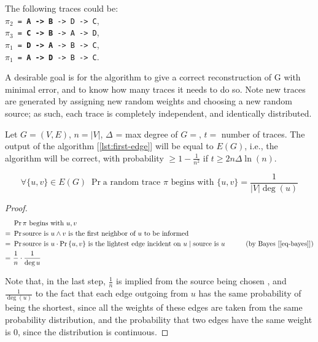 The following traces could be:\\
\texttt{$\pi_2$ = \textbf{A -> B} -> D -> C},\\
\texttt{$\pi_3$ = \textbf{C -> B} -> A -> D},\\
\texttt{$\pi_1$ = \textbf{D -> A} -> B -> C},\\
\texttt{$\pi_1$ = \textbf{A -> D} -> B -> C}.

A desirable goal is for the algorithm to give a correct reconstruction of G with minimal error, and to know how many traces it needs to do so. Note new traces are generated by assigning new random weights and choosing a new random source; as such, each trace is completely independent, and identically distributed.

\begin{thm}\label{thm:first-edge}
    Let $G=(V,E)$, $n=|V|$, $\Delta$ = max degree of $G=$, $t=$ number of traces. The output of the algorithm [\ref{lst:first-edge}] will be equal to $E(G)$, i.e., the algorithm will be correct, with probability $\geq 1 - \frac{1}{n^2}$ if $t \geq 2 n \Delta \ln(n)$.
\end{thm}

\begin{lem}
    \[
        \forall \{u, v\} \in E(G)\; \Pr{\text{a random trace } \pi \text{ begins with } \{u, v\}} = \frac{1}{|V| \deg(u)}
    \]
    
\end{lem}

\begin{proof}
    \begin{align*}
        &\ \Pr{\pi \text{ begins with } u, v} & \\
        =&\ \Pr{\text{source is } u \wedge v \text{ is the first neighbor of } u \text{ to be informed}} & \\
        =&\ \Pr{\text{source is } u} \cdot \Pr{\{u, v\} \text{ is the lightest edge incident on } u \mathrel{|} \text{source is } u}&\tag{by Bayes [\ref{eq-bayes}]} \\
        =&\ \frac{1}{n} \cdot \frac{1}{\deg u} &
    \end{align*}

    Note that, in the last step, $\frac{1}{n}$ is implied from the source being chosen \uar, and $\frac{1}{\deg(u)}$ to the fact that each edge outgoing from $u$ has the same probability of being the shortest, since all the weights of these edges are taken from the same probability distribution, and the probability that two edges have the same weight is 0, since the distribution is continuous.
\end{proof}

